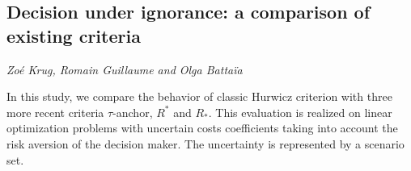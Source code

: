 \documentclass[../booklet.tex]{subfiles}
\begin{document}
\subsection[Decision under ignorance: a comparison of existing criteria. {\it Zoé Krug, Romain Guillaume and Olga Battaïa}]{Decision under ignorance: a comparison of existing criteria}
  

\begin{center}
  {\it Zoé Krug, Romain Guillaume and Olga Battaïa}
\end{center}

\vskip 0.8cm


In this study, we compare the behavior of classic Hurwicz criterion with three more recent criteria $\tau$-anchor, $R^*$ and $R_*$. 
This evaluation is realized on linear optimization problems with uncertain costs coefficients taking into account the risk aversion of the decision maker. The uncertainty is represented by a scenario set. 
\end{document}
